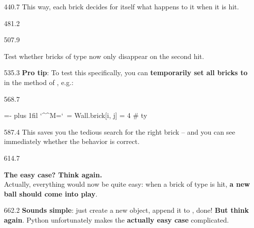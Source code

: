\documentclass{aslab}
\makeatletter
\newcommand*\num[1]{\textcolor{codered}{#1}}
\newcommand*\cmt[1]{\textcolor{codepurple}{#1}}
\newenvironment{pycode}{\par\ttfamily\hyphenchar\font=-1
  \lineskiplimit=-\maxdimen\lineskip=0pt\parindent=0pt
  \parfillskip=0pt plus 1fil\relax
  \catcode`\^^M=\active\catcode`\ =\active\py@setup\py@gobble}{}
\makeatother
\begin{document}
\begin{region}{440.7}
This way, each brick decides for itself what happens to it when it is hit.
\end{region}

\begin{region}{481.2}
\end{region}

\begin{region}{507.9}
\begin{tasks}
\item Test whether bricks of type  now only disappear on the
  second hit.
\end{tasks}
\end{region}

\begin{region}[x=74.7,right=0,pitch=14.3]{535.3}
\textbf{Pro tip}: To test this specifically, you can \textbf{temporarily set
all bricks to}  in the  method of ,
e.g.:
\end{region}

\begin{region}[x=74.7]{568.7}
\begin{pycode}
    Wall.brick[i, j] = \num{4} \cmt{\# ty}
\end{pycode}
\end{region}

\begin{region}[x=74.7,right=0,pitch=13.2]{587.4}
This saves you the tedious search for the right brick -- and you can see
immediately whether the behavior is correct.
\end{region}

\begin{region}[pitch=13.9]{614.7}
\begin{tasks}[start=2]
\item \textbf{The easy case? Think again.}\\
  Actually, everything would now be quite easy: when a brick of type
   is hit, \textbf{a new ball should come into play}.
\end{tasks}
\end{region}

\begin{region}[x=74.7,right=0,pitch=14.3]{662.2}
\textbf{Sounds simple}: just create a new  object, append it to
, done! \textbf{But think again}. Python unfortunately makes
the \textbf{actually easy case} complicated.
\end{region}
\end{document}

